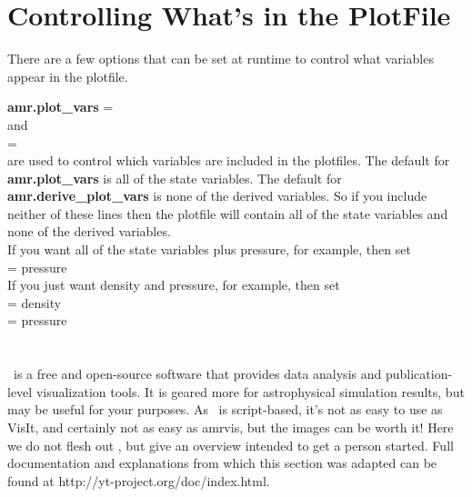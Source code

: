 \section{Controlling What's in the PlotFile}

There are a few options that can be set at runtime to control what
variables appear in the plotfile.

{\bf amr.plot\_vars} = \\

\noindent and  \\

 = \\

\noindent are used to control which variables are included in the plotfiles.  The default for {\bf amr.plot\_vars}
is all of the state variables.  The default for {\bf amr.derive\_plot\_vars} is none of
the derived variables.  So if you include neither of these lines then the plotfile
will contain all of the state variables and none of the derived variables. \\

\noindent If you want all of the state variables plus pressure, for example, then set \\

 = pressure \\

\noindent If you just want density and pressure, for example, then set \\

 =  density \\

 = pressure \\

\section{\yt}\label{sec:yt}
\yt\ is a free and open-source software that provides data analysis and
publication-level visualization tools.  It is geared more for astrophysical
simulation results, but may be useful for your purposes. As \yt\ is script-based, it's not
as easy to use as VisIt, and certainly not as easy as amrvis, but the
images can be worth it! Here we do not flesh out \yt, but give an
overview intended to get a person started. Full documentation and
explanations from which this section was adapted can be found at
http://yt-project.org/doc/index.html.

